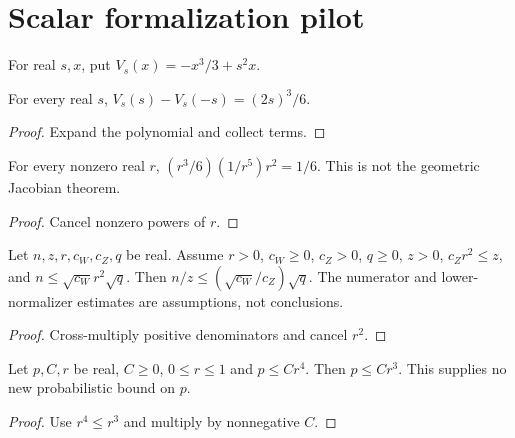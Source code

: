 \section{Scalar formalization pilot}
\begin{definition}
\label{def:fold}
For real $s,x$, put $V_s(x)=-x^3/3+s^2x$.
\end{definition}
\begin{lemma}
\label{lem:fold-gap}
For every real $s$, $V_s(s)-V_s(-s)=(2s)^3/6$.
\end{lemma}
\begin{proof}Expand the polynomial and collect terms.\end{proof}
\begin{lemma}
\label{lem:contact-power}
For every nonzero real $r$, $(r^3/6)(1/r^5)r^2=1/6$.
This is not the geometric Jacobian theorem.
\end{lemma}
\begin{proof}Cancel nonzero powers of $r$.\end{proof}
\begin{lemma}
\label{lem:quotient}
Let $n,z,r,c_W,c_Z,q$ be real. Assume $r>0$, $c_W\ge0$, $c_Z>0$,
$q\ge0$, $z>0$, $c_Zr^2\le z$, and $n\le\sqrt{c_W}r^2\sqrt q$.
Then $n/z\le (\sqrt{c_W}/c_Z)\sqrt q$.
The numerator and lower-normalizer estimates are assumptions, not conclusions.
\end{lemma}
\begin{proof}Cross-multiply positive denominators and cancel $r^2$.\end{proof}
\begin{lemma}
\label{lem:rate}
Let $p,C,r$ be real, $C\ge0$, $0\le r\le1$ and $p\le Cr^4$.
Then $p\le Cr^3$. This supplies no new probabilistic bound on $p$.
\end{lemma}
\begin{proof}Use $r^4\le r^3$ and multiply by nonnegative $C$.\end{proof}

